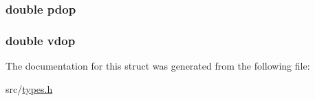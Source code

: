 \subsubsection[{\texorpdfstring{pdop}{pdop}}]{\setlength{\rightskip}{0pt plus 5cm}double pdop}\hypertarget{structgsa_a387b6cbd184865365f92d29fd1ac32c1}{}\label{structgsa_a387b6cbd184865365f92d29fd1ac32c1}
\subsubsection[{\texorpdfstring{vdop}{vdop}}]{\setlength{\rightskip}{0pt plus 5cm}double vdop}\hypertarget{structgsa_a4001a0f05d0c57ebdb066d738098bff7}{}\label{structgsa_a4001a0f05d0c57ebdb066d738098bff7}


The documentation for this struct was generated from the following file\+:\begin{DoxyCompactItemize}
\item 
src/\hyperlink{types_8h}{types.\+h}\end{DoxyCompactItemize}
